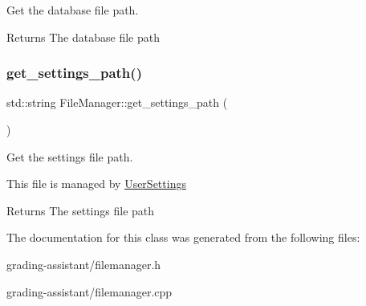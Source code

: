 Get the database file path. 

\begin{DoxyReturn}{Returns}
The database file path 
\end{DoxyReturn}
\mbox{\label{class_file_manager_af358077bb6e0d2db9c772f0bdd247207}} 
\subsubsection{\texorpdfstring{get\+\_\+settings\+\_\+path()}{get\_settings\_path()}}
{\footnotesize\ttfamily std\+::string File\+Manager\+::get\+\_\+settings\+\_\+path (\begin{DoxyParamCaption}{ }\end{DoxyParamCaption})\hspace{0.3cm}{\ttfamily [static]}}



Get the settings file path. 

This file is managed by \hyperlink{class_user_settings}{User\+Settings}

\begin{DoxyReturn}{Returns}
The settings file path 
\end{DoxyReturn}


The documentation for this class was generated from the following files\+:\begin{DoxyCompactItemize}
\item 
grading-\/assistant/filemanager.\+h\item 
grading-\/assistant/filemanager.\+cpp\end{DoxyCompactItemize}
